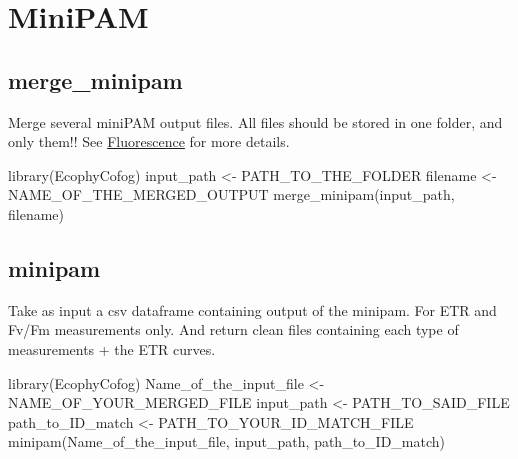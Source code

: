 \documentclass[
  12pt,
  american,
  a4paper,
  extrafontsizes,onecolumn,openright
  ]{memoir}
\newenvironment{Shaded}{\begin{snugshade}}{\end{snugshade}}
\newcommand{\FunctionTok}[1]{\textcolor[rgb]{0.00,0.00,0.00}{#1}}
\newcommand{\NormalTok}[1]{#1}
\newcommand{\OtherTok}[1]{\textcolor[rgb]{0.56,0.35,0.01}{#1}}
\begin{document}
\normalsize

\hypertarget{minipam}{%
\section{MiniPAM}\label{minipam}}

\hypertarget{merge_minipam}{%
\subsection{merge\_minipam}\label{merge_minipam}}

Merge several miniPAM output files.
All files should be stored in one folder, and only them!!
See \protect\hyperlink{fluorescence}{Fluorescence} for more details.

\scriptsize

\begin{Shaded}
\begin{Highlighting}[]
\FunctionTok{library}\NormalTok{(EcophyCofog)}
\NormalTok{input\_path }\OtherTok{\textless{}{-}}\NormalTok{ PATH\_TO\_THE\_FOLDER}
\NormalTok{filename }\OtherTok{\textless{}{-}}\NormalTok{ NAME\_OF\_THE\_MERGED\_OUTPUT}
\FunctionTok{merge\_minipam}\NormalTok{(input\_path, filename)}
\end{Highlighting}
\end{Shaded}

\normalsize

\hypertarget{minipam-1}{%
\subsection{minipam}\label{minipam-1}}

Take as input a csv dataframe containing output of the minipam.
For ETR and Fv/Fm measurements only.
And return clean files containing each type of measurements + the ETR curves.

\scriptsize

\begin{Shaded}
\begin{Highlighting}[]
\FunctionTok{library}\NormalTok{(EcophyCofog)}
\NormalTok{Name\_of\_the\_input\_file }\OtherTok{\textless{}{-}}\NormalTok{ NAME\_OF\_YOUR\_MERGED\_FILE}
\NormalTok{input\_path }\OtherTok{\textless{}{-}}\NormalTok{ PATH\_TO\_SAID\_FILE}
\NormalTok{path\_to\_ID\_match }\OtherTok{\textless{}{-}}\NormalTok{ PATH\_TO\_YOUR\_ID\_MATCH\_FILE}
\FunctionTok{minipam}\NormalTok{(Name\_of\_the\_input\_file, input\_path, path\_to\_ID\_match)}
\end{Highlighting}
\end{Shaded}
\end{document}
